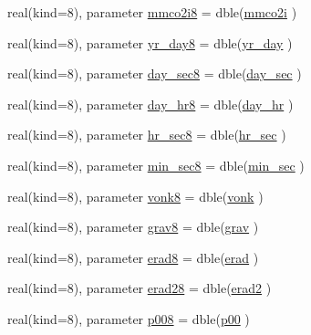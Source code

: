 \begin{DoxyCompactItemize}
\item 
real(kind=8), parameter \hyperlink{namespaceconsts__coms_a7a5da648279dbc405b51c92733fe9301}{mmco2i8} = dble(\hyperlink{namespaceconsts__coms_a2df5d20d56bdc29d0d392c9ec513752a}{mmco2i} )
\item 
real(kind=8), parameter \hyperlink{namespaceconsts__coms_af9fb6bb150a0bc07d04228a98616c962}{yr\+\_\+day8} = dble(\hyperlink{namespaceconsts__coms_adad953349aafb445de8a82640081a357}{yr\+\_\+day} )
\item 
real(kind=8), parameter \hyperlink{namespaceconsts__coms_a00c8967ff3769c4a31bd909961104e13}{day\+\_\+sec8} = dble(\hyperlink{namespaceconsts__coms_a3ff38434ac06e17e92b1929696b56611}{day\+\_\+sec} )
\item 
real(kind=8), parameter \hyperlink{namespaceconsts__coms_aa5f4f318d77a39b4f036f10c9d640211}{day\+\_\+hr8} = dble(\hyperlink{namespaceconsts__coms_a9cac2538090fb8cf04aaeaf9b1f92466}{day\+\_\+hr} )
\item 
real(kind=8), parameter \hyperlink{namespaceconsts__coms_ab0f214f79265c82988672d0e10e674cb}{hr\+\_\+sec8} = dble(\hyperlink{namespaceconsts__coms_acae5e7f232dc6e70cfdeaf44d9263406}{hr\+\_\+sec} )
\item 
real(kind=8), parameter \hyperlink{namespaceconsts__coms_a2b5ca6c06d8637515d08d6f29aa48060}{min\+\_\+sec8} = dble(\hyperlink{namespaceconsts__coms_a34e3f5c2fd6493a836a9797220b50639}{min\+\_\+sec} )
\item 
real(kind=8), parameter \hyperlink{namespaceconsts__coms_aba42a2e8791fbaccb96fdaec989bf033}{vonk8} = dble(\hyperlink{namespaceconsts__coms_ad66b0d002b8c2531bde3625010d94eac}{vonk} )
\item 
real(kind=8), parameter \hyperlink{namespaceconsts__coms_a61919bc434d4bb58d80ace52558d4404}{grav8} = dble(\hyperlink{namespaceconsts__coms_ac1aae6e7087ffc22025cd1527c705e3e}{grav} )
\item 
real(kind=8), parameter \hyperlink{namespaceconsts__coms_abf125d6324bae337a7f09903af9a804e}{erad8} = dble(\hyperlink{namespaceconsts__coms_a359b412a0b4b216f6f33e18264e25f1d}{erad} )
\item 
real(kind=8), parameter \hyperlink{namespaceconsts__coms_a57037c958a453744e08c3297a5718753}{erad28} = dble(\hyperlink{namespaceconsts__coms_a81a49e39b11ce112f102ddd3dd2c4270}{erad2} )
\item 
real(kind=8), parameter \hyperlink{namespaceconsts__coms_a9b5c692d7673876383486b7799a59d94}{p008} = dble(\hyperlink{namespaceconsts__coms_a2e56fe1bdb69a647d3bdfd214a331e4a}{p00} )
\item 

\end{DoxyCompactItemize}
